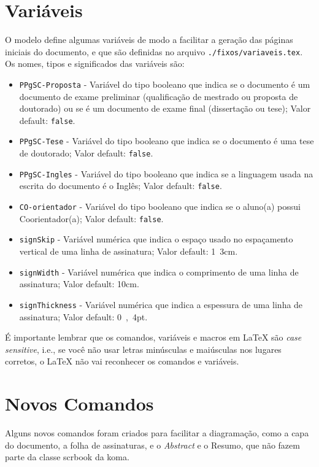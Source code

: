 \section{Variáveis}
O modelo define algumas variáveis de modo a facilitar a geração das páginas iniciais do documento, e que são definidas no arquivo \texttt{./fixos/variaveis.tex}. Os nomes, tipos e significados das variáveis são:

\begin{itemize}
	\item \texttt{PPgSC-Proposta} - Variável do tipo booleano que indica se o documento é um documento de exame preliminar (qualificação de mestrado ou proposta de doutorado) ou se é um documento de exame final (dissertação ou tese); Valor default: \texttt{false}.
	\item \texttt{PPgSC-Tese} - Variável do tipo booleano que indica se o documento é uma tese de doutorado; Valor default: \texttt{false}.
	\item \texttt{PPgSC-Ingles} - Variável do tipo booleano que indica se a linguagem usada na escrita do documento é o Inglês; Valor default: \texttt{false}.
	\item \texttt{CO-orientador} - Variável do tipo booleano que indica se o aluno(a) possui Coorientador(a); Valor default: \texttt{false}.
	\item \texttt{signSkip} - Variável numérica que indica o espaço usado no espaçamento vertical de uma linha de assinatura; Valor default: \si{1.3cm}.
	\item \texttt{signWidth} - Variável numérica que indica o comprimento de uma linha de assinatura; Valor default: \si{10cm}.
	\item \texttt{signThickness} - Variável numérica que indica a espessura de uma linha de assinatura;  Valor default: \si{0,4pt}.
\end{itemize}

É importante lembrar que os comandos, variáveis e macros em \LaTeX{} são \textit{case sensitive}, i.e., se você não usar letras minúsculas e maiúsculas nos lugares corretos, o \LaTeX{} não vai reconhecer os comandos e variáveis.

\section{Novos Comandos}
Alguns novos comandos foram criados para facilitar a diagramação, como a capa do documento, a folha de assinaturas, e o \textit{Abstract} e o Resumo, que não fazem parte da classe \gls{scrbook} da \gls{koma}.

